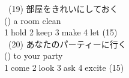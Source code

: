 \documentclass[uplatex]{jsarticle}
\begin{document}
\ (19) 部屋をきれいにしておく\\
\hspace{10mm}(\hspace{10mm}) a room clean\\
\hspace{10mm}\textcircled{\normalsize1}hold \textcircled{\normalsize2}keep \textcircled{\normalsize3}make \textcircled{\normalsize4}let 
\hspace{\fill}(15)\underline{\hspace{35mm}}\\
\ (20) あなたのパーティーに行く\\
\hspace{10mm}(\hspace{10mm}) to your party\\
\hspace{10mm}\textcircled{\normalsize1}come \textcircled{\normalsize2}look \textcircled{\normalsize3}ask \textcircled{\normalsize4}excite 
\hspace{\fill}(15)\underline{\hspace{35mm}}\\
% 
\end{document}
